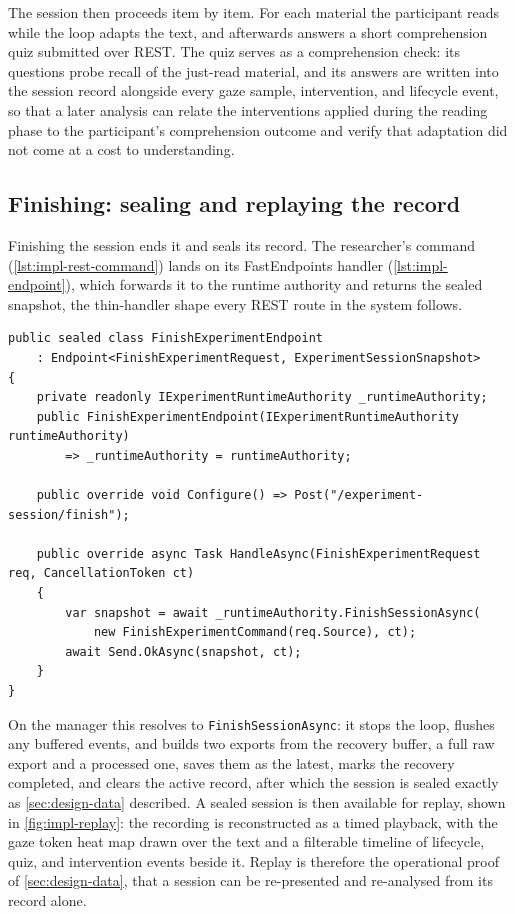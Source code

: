 The session then proceeds item by item.
For each material the participant reads while the loop adapts the text, and afterwards answers a short comprehension quiz submitted over REST.
The quiz serves as a comprehension check: its questions probe recall of the just-read material, and its answers are written into the session record alongside every gaze sample, intervention, and lifecycle event, so that a later analysis can relate the interventions applied during the reading phase to the participant's comprehension outcome and verify that adaptation did not come at a cost to understanding.

\subsection*{Finishing: sealing and replaying the record}

Finishing the session ends it and seals its record.
The researcher's  command (\cref{lst:impl-rest-command}) lands on its FastEndpoints handler (\cref{lst:impl-endpoint}), which forwards it to the runtime authority and returns the sealed snapshot, the thin-handler shape every REST route in the system follows.

\begin{listing}[htbp]
\begin{verbatim}
public sealed class FinishExperimentEndpoint
    : Endpoint<FinishExperimentRequest, ExperimentSessionSnapshot>
{
    private readonly IExperimentRuntimeAuthority _runtimeAuthority;
    public FinishExperimentEndpoint(IExperimentRuntimeAuthority runtimeAuthority)
        => _runtimeAuthority = runtimeAuthority;

    public override void Configure() => Post("/experiment-session/finish");

    public override async Task HandleAsync(FinishExperimentRequest req, CancellationToken ct)
    {
        var snapshot = await _runtimeAuthority.FinishSessionAsync(
            new FinishExperimentCommand(req.Source), ct);
        await Send.OkAsync(snapshot, ct);
    }
}
\end{verbatim}
\caption{A REST endpoint (abbreviated from \texttt{FinishExperimentEndpoint.cs}). Depends on a core port, maps the request to an application command, and returns the snapshot; no logic in the transport layer.}
\label{lst:impl-endpoint}
\end{listing}

On the manager this resolves to \texttt{FinishSessionAsync}: it stops the loop, flushes any buffered events, and builds two exports from the recovery buffer, a full raw export and a processed one, saves them as the latest, marks the recovery completed, and clears the active record, after which the session is sealed exactly as \cref{sec:design-data} described.
A sealed session is then available for replay, shown in \cref{fig:impl-replay}: the recording is reconstructed as a timed playback, with the gaze token heat map drawn over the text and a filterable timeline of lifecycle, quiz, and intervention events beside it.
Replay is therefore the operational proof of \cref{sec:design-data}, that a session can be re-presented and re-analysed from its record alone.

